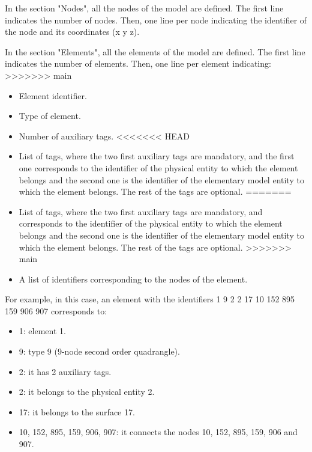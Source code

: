\documentclass[a4]{article}
\begin{document}
In the section "Nodes", all the nodes of the model are defined. The first line indicates the number of nodes. Then, one line per node indicating the identifier of the node and its coordinates (x y z).

In the section "Elements", all the elements of the model are defined. The first line indicates the number of elements. Then, one line per element indicating:
>>>>>>> main

\begin{itemize}
	\item Element identifier.
	\item Type of element.
	\item Number of auxiliary tags.
<<<<<<< HEAD
	\item List of tags, where the two first auxiliary tags are mandatory, and the first one corresponds to the identifier of the physical entity to which the element belongs and the second one is the identifier of the elementary model entity to which the element belongs. The rest of the tags are optional.
=======
	\item List of tags, where the two first auxiliary tags are mandatory, and corresponds to the identifier of the physical entity to which the element belongs and the second one is the identifier of the elementary model entity to which the element belongs. The rest of the tags are optional.
>>>>>>> main
	\item A list of identifiers corresponding to the nodes of the element.
\end{itemize}

For example, in this case, an element with the identifiers 1 9 2 2 17 10 152 895 159 906 907 corresponds to:

\begin{itemize}
	\item 1: element 1.
	\item 9: type 9 (9-node second order quadrangle).
	\item 2: it has 2 auxiliary tags.
	\item 2: it belongs to the physical entity 2.
	\item 17: it belongs to the surface 17.
	\item 10, 152, 895, 159, 906, 907: it connects the nodes 10, 152, 895, 159, 906 and 907.
\end{itemize} 
\end{document}
